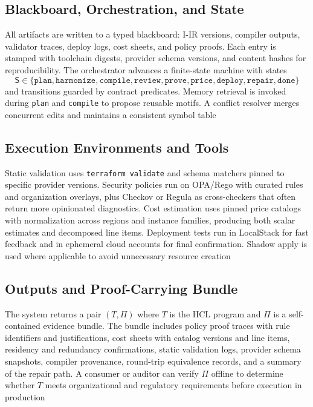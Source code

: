 \documentclass[acmsmall,screen,review,anonymous]{acmart}
\begin{document}
\subsection{Blackboard, Orchestration, and State}
\label{sec:blackboard}

All artifacts are written to a typed blackboard: I-IR versions, compiler outputs, validator traces, deploy logs, cost sheets, and policy proofs. Each entry is stamped with toolchain digests, provider schema versions, and content hashes for reproducibility. The orchestrator advances a finite-state machine with states
\begin{equation}
\mathsf{S} \in \{\texttt{plan},\texttt{harmonize},\texttt{compile},\texttt{review},\texttt{prove},\texttt{price},\texttt{deploy},\texttt{repair},\texttt{done}\}
\end{equation}
and transitions guarded by contract predicates. Memory retrieval is invoked during \texttt{plan} and \texttt{compile} to propose reusable motifs. A conflict resolver merges concurrent edits and maintains a consistent symbol table

\subsection{Execution Environments and Tools}
\label{sec:env}

Static validation uses \texttt{terraform validate} and schema matchers pinned to specific provider versions. Security policies run on OPA/Rego with curated rules and organization overlays, plus Checkov or Regula as cross-checkers that often return more opinionated diagnostics. Cost estimation uses pinned price catalogs with normalization across regions and instance families, producing both scalar estimates and decomposed line items. Deployment tests run in LocalStack for fast feedback and in ephemeral cloud accounts for final confirmation. Shadow apply is used where applicable to avoid unnecessary resource creation

\subsection{Outputs and Proof-Carrying Bundle}
\label{sec:outputs}

The system returns a pair $(T,\Pi)$ where $T$ is the HCL program and $\Pi$ is a self-contained evidence bundle. The bundle includes policy proof traces with rule identifiers and justifications, cost sheets with catalog versions and line items, residency and redundancy confirmations, static validation logs, provider schema snapshots, compiler provenance, round-trip equivalence records, and a summary of the repair path. A consumer or auditor can verify $\Pi$ offline to determine whether $T$ meets organizational and regulatory requirements before execution in production
\end{document}
